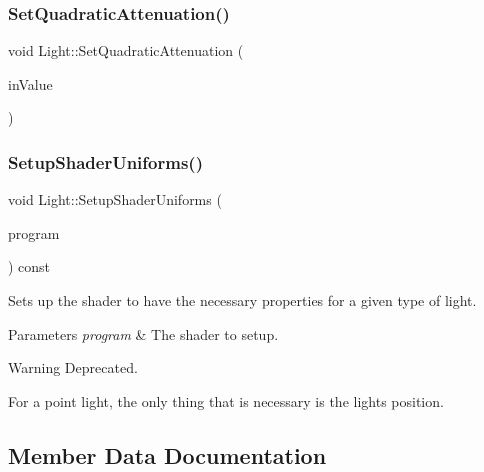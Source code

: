 \hypertarget{class_light_a413e0445d66742c666114dd74d689fc6}{}\label{class_light_a413e0445d66742c666114dd74d689fc6}
\subsubsection{\texorpdfstring{Set\+Quadratic\+Attenuation()}{SetQuadraticAttenuation()}}
{\footnotesize\ttfamily void Light\+::\+Set\+Quadratic\+Attenuation (\begin{DoxyParamCaption}\item[{float}]{in\+Value }\end{DoxyParamCaption})}

\hypertarget{class_light_adb3750e44ae24fefa1f4c89f933b2677}{}\label{class_light_adb3750e44ae24fefa1f4c89f933b2677}
\subsubsection{\texorpdfstring{Setup\+Shader\+Uniforms()}{SetupShaderUniforms()}}
{\footnotesize\ttfamily void Light\+::\+Setup\+Shader\+Uniforms (\begin{DoxyParamCaption}\item[{const class \hyperlink{class_shader_program}{Shader\+Program} $\ast$}]{program }\end{DoxyParamCaption}) const\hspace{0.3cm}{\ttfamily [virtual]}}



Sets up the shader to have the necessary properties for a given type of light.


\begin{DoxyParams}{Parameters}
{\em program} & The shader to setup. \\
\hline
\end{DoxyParams}
\begin{DoxyWarning}{Warning}
Deprecated.
\end{DoxyWarning}
For a point light, the only thing that is necessary is the light\textquotesingle{}s position.

\subsection{Member Data Documentation}
\hypertarget{class_light_afef6c00a21aa16dc6cc7a7fb1639d2fa}{}\label{class_light_afef6c00a21aa16dc6cc7a7fb1639d2fa}
